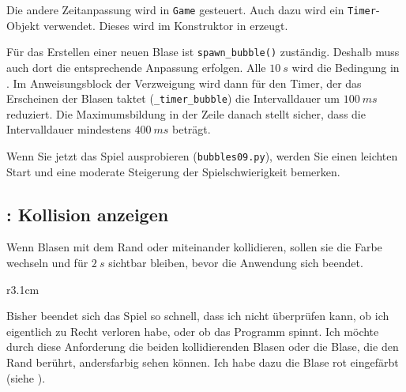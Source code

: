 Die andere Zeitanpassung wird in \texttt{Game} gesteuert. Auch dazu wird ein \texttt{Timer}-Objekt verwendet. Dieses wird im Konstruktor in  erzeugt.


Für das Erstellen einer neuen Blase ist \texttt{spawn\_bubble()} zuständig. Deshalb muss auch dort die entsprechende Anpassung erfolgen. Alle $10~s$ wird die Bedingung in  \true. Im Anweisungsblock der Verzweigung wird dann für den Timer, der das Erscheinen der Blasen taktet (\texttt{\_timer\_bubble}) die Intervalldauer um $100~ms$ reduziert. Die Maximumsbildung in der Zeile danach stellt sicher, dass die Intervalldauer mindestens $400~ms$ beträgt.


Wenn Sie jetzt das Spiel ausprobieren (\texttt{bubbles09.py}), werden Sie einen leichten Start und eine moderate Steigerung der Spielschwierigkeit bemerken.

\subsection{: Kollision anzeigen}
	Wenn Blasen mit dem Rand oder miteinander kollidieren, sollen sie die Farbe wechseln und für $2~s$ sichtbar bleiben, bevor die Anwendung sich beendet.
\er

\begin{wrapfigure}[6]{r}{3.1cm}%
	\begin{center}%
		\vspace{-1cm}%
	\end{center}%
\end{wrapfigure}%
Bisher beendet sich das Spiel so schnell, dass ich nicht überprüfen kann, ob ich eigentlich zu Recht verloren habe, oder ob das Programm spinnt. Ich möchte durch diese Anforderung die beiden kollidierenden Blasen oder die Blase, die den Rand berührt, andersfarbig sehen können. Ich habe dazu die Blase rot eingefärbt (siehe ). 

